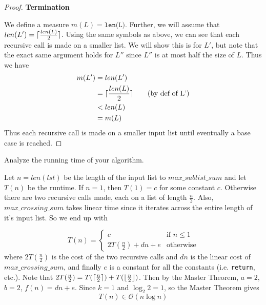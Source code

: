 \begin{proof}
    \vspace{5mm}
    
    \textbf{Termination}
    
    We define a measure $m(L) = \texttt{len(L)}$. 
    Further, we will assume that
    $len(L') = \lceil\frac{len(L)}{2}\rceil$.
    Using the same
    symbols as above, we can see that each recursive call is made
    on a smaller list. We will show this is for $L'$, but note that
    the exact same argument holds for $L''$ since $L''$ is at most
    half the size of $L$.
    Thus we have
    \begin{align*}
        m(L') &= len(L') \\
        &= \lceil\frac{len(L)}{2}\rceil \tag{by def of L'} \\
        &< len(L) \\
        &= m(L)
    \end{align*}
    Thus each recursive call is made on a smaller input list until
    eventually a base case is reached.
    
    \end{proof}

\newpage

    Analyze the running time of your algorithm.
    
    Let $n = len(lst)$ be the length of the input list to
    $max\_sublist\_sum$
    and let $T(n)$ be the runtime. If $n = 1$, then $T(1) = c$ for some 
    constant $c$. Otherwise there are two recursive calls made, each
    on a list of length $\frac{n}{2}$. Also, $max\_crossing\_sum$
    takes linear time since it iterates across the entire length of
    it's input list. So we end up with
    
    \[ 
    T(n) = 
    \begin{cases} 
        c & \text{if $n \leqslant 1$} \\
        2T(\frac{n}{2}) + dn + e & \text{otherwise}
    \end{cases}
    \]
    where $2T(\frac{n}{2})$ is the cost of the two recursive calls and
    $dn$ is the linear cost of $max\_crossing\_sum$, and finally
    $e$ is a constant for all the constants (i.e. \texttt{return}, etc.).
    Note that $2T(\frac{n}{2}) = T(\lceil\frac{n}{2}\rceil) + T(\lfloor\frac{n}{2}\rfloor)$.
    Then by the Master Theorem, $a = 2$, $b = 2$, $f(n) = dn + e$.
    Since $k = 1$ and $\log_{2}{2} = 1$, so the Master Theorem gives
    $$T(n) \in \mathcal{O}(n \log{n})$$

\newpage